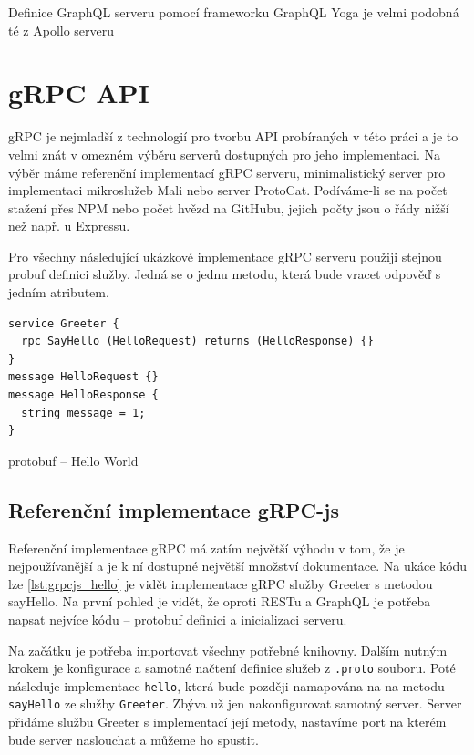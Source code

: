 \documentclass[thesis=M,czech]{FITthesis}[2019/12/23]
\begin{document}
Definice GraphQL serveru pomocí frameworku GraphQL Yoga je velmi podobná té z Apollo serveru

\section{gRPC API}
gRPC je nejmladší z technologií pro tvorbu API probíraných v této práci a je to velmi znát v omezném výběru serverů dostupných pro jeho implementaci. Na výběr máme referenční implementací gRPC serveru, minimalistický server pro implementaci mikroslužeb Mali nebo server ProtoCat. Podíváme-li se na počet stažení přes NPM nebo počet hvězd na GitHubu, jejich počty jsou o řády nižší než např. u Expressu.

Pro všechny následující ukázkové implementace gRPC serveru použiji stejnou probuf definici služby. Jedná se o jednu metodu, která bude vracet odpověď s jedním atributem.

\begin{listing}[H]
\begin{verbatim}
service Greeter {
  rpc SayHello (HelloRequest) returns (HelloResponse) {}
}
message HelloRequest {}
message HelloResponse {
  string message = 1;
}
\end{verbatim}
\caption{protobuf -- Hello World}
\label{lst:protobuf_hello}
\end{listing}

\subsection*{Referenční implementace gRPC-js}
Referenční implementace gRPC má zatím největší výhodu v tom, že je nejpoužívanější a je k ní dostupné největší množství dokumentace.
Na ukáce kódu lze \ref{lst:grpcjs_hello} je vidět implementace gRPC služby Greeter s metodou sayHello. Na první pohled je vidět, že oproti RESTu a GraphQL je potřeba napsat nejvíce kódu -- protobuf definici a inicializaci serveru.

Na začátku je potřeba importovat všechny potřebné knihovny. Dalším nutným krokem je konfigurace a samotné načtení definice služeb z \texttt{.proto} souboru. Poté následuje implementace \texttt{hello}, která bude později namapována na na metodu \texttt{sayHello} ze služby \texttt{Greeter}. Zbýva už jen nakonfigurovat samotný server. Server přidáme službu Greeter s implementací její metody, nastavíme port na kterém bude server naslouchat a můžeme ho spustit.
\end{document}
